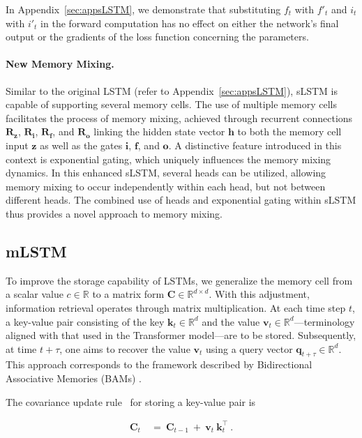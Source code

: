 In Appendix~\ref{sec:appsLSTM}, we demonstrate that substituting $f_t$ with $f'_t$ and $i_t$ with $i'_t$ in the forward computation has no effect on either the network's final output or the gradients of the loss function concerning the parameters.

\paragraph{New Memory Mixing.} Similar to the original LSTM (refer to Appendix~\ref{sec:appsLSTM}), sLSTM is capable of supporting several memory cells. The use of multiple memory cells facilitates the process of memory mixing, achieved through recurrent connections $\mathbf{R}_{\mathbf{z}}$, $\mathbf{R}_{\mathbf{i}}$, $\mathbf{R}_{\mathbf{f}}$, and $\mathbf{R}_{\mathbf{o}}$ linking the hidden state vector $\mathbf{h}$ to both the memory cell input $\mathbf{z}$ as well as the gates $\mathbf{i}$, $\mathbf{f}$, and $\mathbf{o}$. A distinctive feature introduced in this context is exponential gating, which uniquely influences the memory mixing dynamics. In this enhanced sLSTM, several heads can be utilized, allowing memory mixing to occur independently within each head, but not between different heads. The combined use of heads and exponential gating within sLSTM thus provides a novel approach to memory mixing.

\subsection{mLSTM}
\label{sec:mLSTM}

To improve the storage capability of LSTMs, we generalize the memory cell from a scalar value $c \in \mathbb{R}$ to a matrix form $\mathbf{C} \in \mathbb{R}^{d \times d}$. With this adjustment, information retrieval operates through matrix multiplication. At each time step $t$, a key-value pair consisting of the key $\mathbf{k}_t \in \mathbb{R}^d$ and the value $\mathbf{v}_t \in \mathbb{R}^d$—terminology aligned with that used in the Transformer model—are to be stored. Subsequently, at time $t+\tau$, one aims to recover the value $\mathbf{v}_t$ using a query vector $\mathbf{q}_{t+\tau} \in \mathbb{R}^d$. This approach corresponds to the framework described by Bidirectional Associative Memories (BAMs) \citep{Kohonen:72,Anderson:72,Nakano:72,Anderson:77}.

The covariance update rule~\citep{Sejnowski:77,Dayan:91} for storing a key-value pair is

\begin{align}
\mathbf{C}_t \ &= \ \mathbf{C}_{t-1} \ + \ \mathbf{v}_{t} \ \mathbf{k}_t^\top \ .
\end{align}

